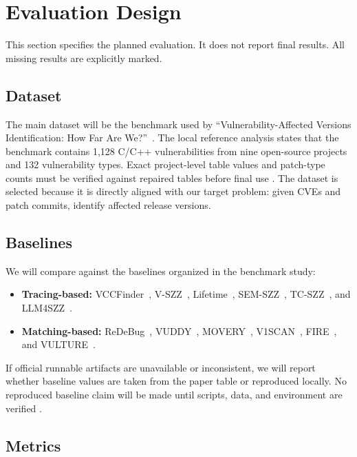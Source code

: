 \section{Evaluation Design}
\label{sec:evaluation}

This section specifies the planned evaluation. It does not report final \toolname results. All missing results are explicitly marked.

\subsection{Dataset}

The main dataset will be the benchmark used by ``Vulnerability-Affected Versions Identification: How Far Are We?''~\cite{howfar2025}. The local reference analysis states that the benchmark contains 1,128 C/C++ vulnerabilities from nine open-source projects and 132 vulnerability types. Exact project-level table values and patch-type counts must be verified against repaired tables before final use . The dataset is selected because it is directly aligned with our target problem: given CVEs and patch commits, identify affected release versions.

\subsection{Baselines}

We will compare against the baselines organized in the benchmark study:
\begin{itemize}[leftmargin=*]
  \item \textbf{Tracing-based:} VCCFinder~\cite{vccfinder2015}, V-SZZ~\cite{vszz2022}, Lifetime~\cite{lifetime2021}, SEM-SZZ~\cite{semszz2024}, TC-SZZ~\cite{tcszz2024}, and LLM4SZZ~\cite{llm4szz2025}.
  \item \textbf{Matching-based:} ReDeBug~\cite{redebug2012}, VUDDY~\cite{vuddy2017}, MOVERY~\cite{movery2022}, V1SCAN~\cite{v1scan2023}, FIRE~\cite{fire2024}, and VULTURE~\cite{vulture2025}.
\end{itemize}

If official runnable artifacts are unavailable or inconsistent, we will report whether baseline values are taken from the paper table or reproduced locally. No reproduced baseline claim will be made until scripts, data, and environment are verified .

\subsection{Metrics}

